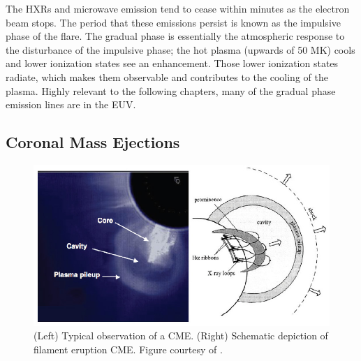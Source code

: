 The HXRs and microwave emission tend to cease within minutes as the electron beam stops. The period that these emissions persist is known as the impulsive phase of the flare. The gradual phase is essentially the atmospheric response to the disturbance of the impulsive phase; the hot plasma (upwards of 50 MK) cools and lower ionization states see an enhancement. Those lower ionization states radiate, which makes them observable and contributes to the cooling of the plasma. Highly relevant to the following chapters, many of the gradual phase emission lines are in the EUV. 

\subsection{Coronal Mass Ejections}
\label{sec:cmes}

\begin{figure}[!h]
    \begin{center}
	    \includegraphics[width=\textwidth]{Images/CMESchematic.png}
    \end{center}
    \caption[Coronal mass ejection schematic]{
        (Left) Typical observation of a CME. (Right) Schematic depiction of filament eruption CME. 
        Figure courtesy of \citet{Forbes2000}.
    }
    \label{fig:cmeschematic}
\end{figure}

